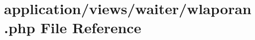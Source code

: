 \hypertarget{wlaporan_8php}{}\section{application/views/waiter/wlaporan.php File Reference}
\label{wlaporan_8php}
